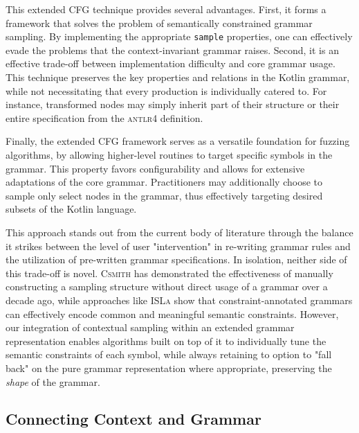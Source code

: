 This extended \gls{CFG} technique provides several advantages.
First, it forms a framework that solves the problem of semantically constrained grammar sampling.
By implementing the appropriate \texttt{sample} properties,
one can effectively evade the problems that the context-invariant grammar raises.
Second, it is an effective trade-off between implementation difficulty and core grammar usage. 
This technique preserves the key properties and relations in the Kotlin grammar, while
not necessitating that every production is individually catered to. 
For instance, transformed nodes may simply inherit part of
their structure or their entire specification from the \textsc{antlr4} definition.

Finally, the extended \gls{CFG} framework serves as a versatile foundation for fuzzing
algorithms, by allowing higher-level routines to target specific symbols in the grammar.
This property favors configurability and allows for extensive adaptations
of the core grammar.
Practitioners may additionally choose to sample only select nodes in the grammar,
thus effectively targeting desired subsets of the Kotlin language.

This approach stands out from the current body of literature through 
the balance it strikes between the level of user "intervention" in re-writing grammar
rules and the utilization of pre-written grammar specifications.
In isolation, neither side of this trade-off is novel.
\textsc{Csmith} \cite{yang2011finding} has demonstrated the effectiveness
of manually constructing a sampling structure without
direct usage of a grammar over a decade ago, while approaches like
\textsc{ISLa} \cite{steinhofel2022input} show that
constraint-annotated grammars can effectively encode
common and meaningful semantic constraints.
However, our integration of contextual sampling within an extended
grammar representation enables algorithms built on top of it
to individually tune the semantic constraints of each
symbol, while always retaining to option to "fall back" on the 
pure grammar representation where appropriate, preserving the \textit{shape} of the grammar.
\subsection{\label{subsec:context-efcg} Connecting Context and Grammar}



